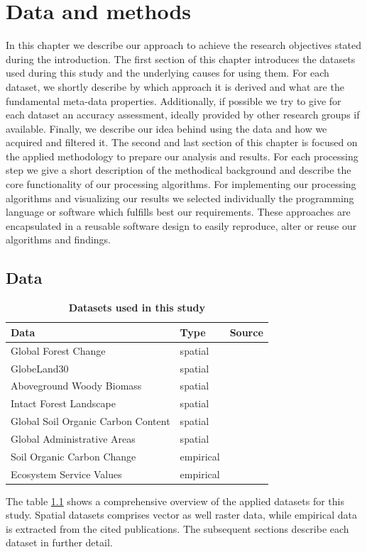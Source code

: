 \chapter{Data and methods}
\label{ch:data_methods}
	In this chapter we describe our approach to achieve the research objectives stated during the introduction. The first section of this chapter introduces the datasets used during this study and the underlying causes for using them. For each dataset, we shortly describe by which approach it is derived and what are the fundamental meta-data properties. Additionally, if possible we try to give for each dataset an accuracy assessment, ideally provided by other research groups if available. Finally, we describe our idea behind using the data and how we acquired and filtered it. The second and last section of this chapter is focused on the applied methodology to prepare our analysis and results. For each processing step we give a short description of the methodical background and describe the core functionality of our processing algorithms. For implementing our processing algorithms and visualizing our results we selected individually the programming language or software which fulfills best our requirements. These approaches are encapsulated in a reusable software design to easily reproduce, alter or reuse our algorithms and findings.

\section{Data}
\label{sec:data}
	\begin{table}[ht]
		\centering
		\caption[Datasets used in this study]{\textbf{Datasets used in this study}}
		\label{tab:datasets}
		\begin{tabular}{lll}
			\hline
			Data & Type & Source \\\hline
			Global Forest Change & spatial & \citet{Hansen2013} \\
			GlobeLand30 & spatial & \citet{Chen2015} \\
			Aboveground Woody Biomass & spatial & \citet{Baccini2015} \\
			Intact Forest Landscape & spatial & \citet{Potapov2017} \\
			Global Soil Organic Carbon Content & spatial & \citet{FAO2018} \\
			Global Administrative Areas & spatial & \citet{Hijmans2018} \\
			Soil Organic Carbon Change & empirical & \citet{Don2010} \\
			\multirow{3}{*}{Ecosystem Service Values} & \multirow{3}{*}{empirical} & \citet{Costanza2014} \\
			&& \citet{Groot2012} \\
			&& \citet{Siikamaki2015} \\\hline
		\end{tabular}
	\end{table}
	The table \ref{tab:datasets} shows a comprehensive overview of the applied datasets for this study. Spatial datasets comprises vector as well raster data, while empirical data is extracted from the cited publications. The subsequent sections describe each dataset in further detail.


